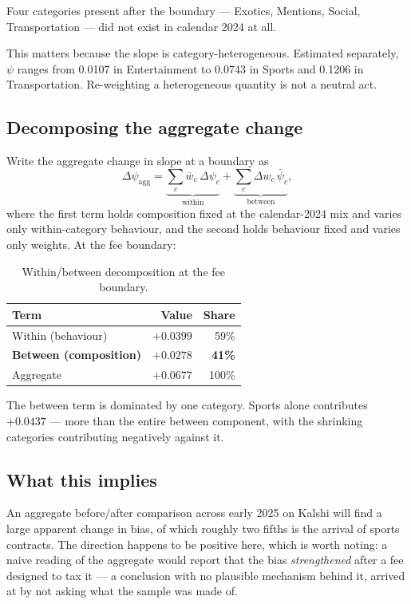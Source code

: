 \documentclass[preprint,12pt,authoryear]{elsarticle}
\begin{document}
Four categories present after the boundary --- Exotics, Mentions, Social,
Transportation --- did not exist in calendar 2024 at all.

This matters because the slope is category-heterogeneous. Estimated separately,
$\psi$ ranges from 0.0107 in Entertainment to 0.0743 in Sports and 0.1206 in
Transportation. Re-weighting a heterogeneous quantity is not a neutral act.

\subsection{Decomposing the aggregate change}\label{sec:decomp}

Write the aggregate change in slope at a boundary as
\begin{equation}
\Delta\psi_{\mathrm{agg}}
  = \underbrace{\sum_c \bar{w}_c \, \Delta\psi_c}_{\text{within}}
  + \underbrace{\sum_c \Delta w_c \, \bar{\psi}_c}_{\text{between}},
\end{equation}
where the first term holds composition fixed at the calendar-2024 mix and varies
only within-category behaviour, and the second holds behaviour fixed and varies
only weights. At the fee boundary:

\begin{table}[htbp]
\centering
\caption{Within/between decomposition at the fee boundary.}
\begin{tabular}{lrr}
\toprule
Term & Value & Share \\
\midrule
Within (behaviour)               & $+0.0399$ & 59\% \\
\textbf{Between (composition)}   & \textbf{$+0.0278$} & \textbf{41\%} \\
Aggregate                        & $+0.0677$ & 100\% \\
\bottomrule
\end{tabular}
\end{table}

The between term is dominated by one category. Sports alone contributes
$+0.0437$ --- more than the entire between component, with the shrinking
categories contributing negatively against it.

\subsection{What this implies}

An aggregate before/after comparison across early 2025 on Kalshi will find a
large apparent change in bias, of which roughly two fifths is the arrival of
sports contracts. The direction happens to be positive here, which is worth
noting: a naive reading of the aggregate would report that the bias
\emph{strengthened} after a fee designed to tax it --- a conclusion with no
plausible mechanism behind it, arrived at by not asking what the sample was made
of.
\end{document}
